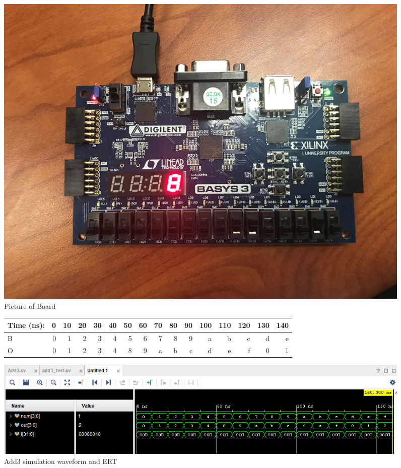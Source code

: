 \documentclass[11pt]{article}
\begin{document}
\begin{figure}[ht]\centering
	\includegraphics[width=1.0\textwidth]{8}
	\caption{Picture of Board}
	\label{fig:sim_with_table}
\end{figure}


\begin{figure}[ht]\centering
	\begin{tabular}{l|rrrrrrrrrrrrrrr}
		Time (ns): & 0 & 10 & 20 & 30 & 40 & 50 & 60 & 70 & 80 & 90 & 100 & 110 & 120 & 130 & 140 \\
		\midrule 
		B & 0 & 1 & 2 & 3 & 4 & 5 & 6 & 7 & 8 & 9 & a & b & c & d & e \\
		O & 0 & 1 & 2 & 3 & 4 & 8 & 9 & a & b & c & d & e & f & 0 & 1\\
		
		 
	\end{tabular}\medskip
	
	\includegraphics[width=1.0\textwidth]{Add3WaveForm}
	\caption{Add3 simulation waveform and ERT}
	\label{fig:sim_with_table}
\end{figure}
\end{document}
